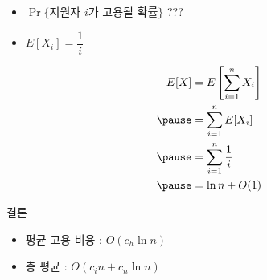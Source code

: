 \documentclass[10pt]{beamer}
\begin{document}
\begin{frame}{}
    \begin{itemize}
        \item $\Pr\{\mbox{지원자 $i$가 고용될 확률}\}$ ???
        \pause
        \item $E[X_i] = \dfrac{1}{i}$
        \pause
    \end{itemize}

    \[
        \begin{aligned}  
          E[X] &= E \left[  \sum_{i=1}^n X_i  \right] \\ \pause
          &= \sum_{i=1}^n E[X_i] \\ \pause
          &= \sum_{i=1}^n \dfrac{1}{i} \\ \pause
          &= \ln n + O(1)
        \end{aligned}
    \]
\end{frame}



\begin{frame}{결론}
    \begin{itemize}
        \item 평균 고용 비용 : $O(c_h \ln n)$\pause
        \item 총 평균 : $O(c_in + c_n \ln n)$
    \end{itemize}

\end{frame}









\end{document}
